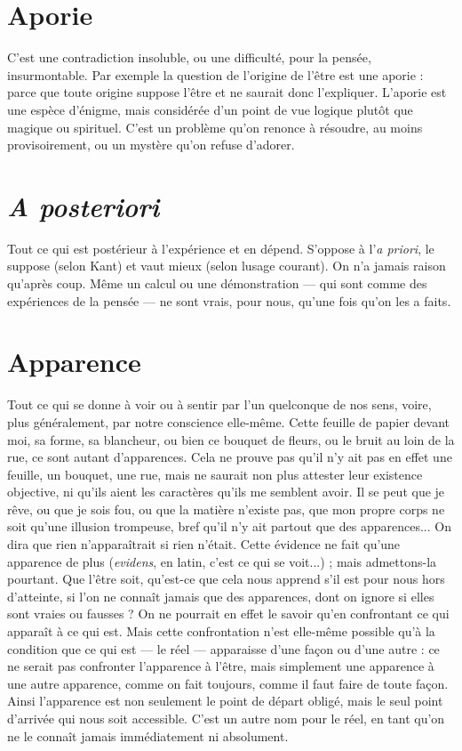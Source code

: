 \section{Aporie}
C'est une contradiction insoluble, ou une difficulté, pour la pensée,
insurmontable. Par exemple la question de l’origine de l’être
est une aporie : parce que toute origine suppose l'être et ne saurait donc
l'expliquer. L’aporie est une espèce d’énigme, mais considérée d’un point de
vue logique plutôt que magique ou spirituel. C’est un problème qu’on
renonce à résoudre, au moins provisoirement, ou un mystère qu’on refuse
d’adorer.

\section{\it A posteriori}
Tout ce qui est postérieur à l’expérience et en dépend.
S’oppose à l’{\it a priori}, le suppose (selon Kant) et vaut mieux
(selon lusage courant). On n’a jamais raison qu'après coup. Même un calcul
ou une démonstration — qui sont comme des expériences de la pensée — ne sont
vrais, pour nous, qu’une fois qu’on les a faits.

\section{Apparence}
Tout ce qui se donne à voir ou à sentir par l’un quelconque de
nos sens, voire, plus généralement, par notre conscience
elle-même. Cette feuille de papier devant moi, sa forme, sa blancheur, ou
bien ce bouquet de fleurs, ou le bruit au loin de la rue, ce sont autant
d’apparences. Cela ne prouve pas qu’il n’y ait pas en effet une feuille, un
bouquet, une rue, mais ne saurait non plus attester leur existence objective,
ni qu'ils aient les caractères qu’ils me semblent avoir. Il se peut que je rêve,
ou que je sois fou, ou que la matière n'existe pas, que mon propre corps ne
soit qu’une illusion trompeuse, bref qu’il n’y ait partout que des apparences...
On dira que rien n’apparaîtrait si rien n’était. Cette évidence ne
fait qu’une apparence de plus ({\it evidens}, en latin, c’est ce qui se voit...) ; mais
admettons-la pourtant. Que l’être soit, qu'est-ce que cela nous apprend s’il
est pour nous hors d’atteinte, si l’on ne connaît jamais que des apparences,
dont on ignore si elles sont vraies ou fausses ? On ne pourrait en effet le
savoir qu’en confrontant ce qui apparaît à ce qui est. Mais cette confrontation
n’est elle-même possible qu’à la condition que ce qui est — le réel —
apparaisse d’une façon ou d’une autre : ce ne serait pas confronter l’apparence
à l’être, mais simplement une apparence à une autre apparence,
comme on fait toujours, comme il faut faire de toute façon. Ainsi l’apparence
est non seulement le point de départ obligé, mais le seul point
d'arrivée qui nous soit accessible. C’est un autre nom pour le réel, en tant
qu'on ne le connaît jamais immédiatement ni absolument.

